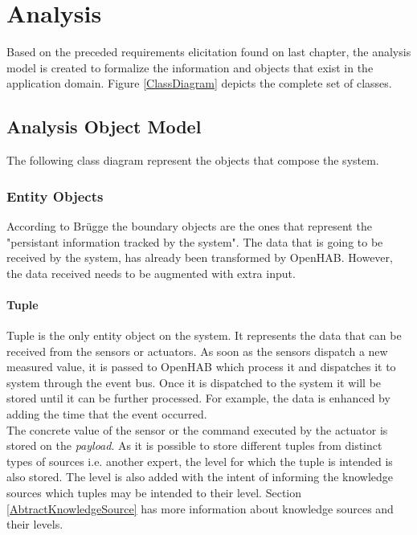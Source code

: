 
		
\chapter{Analysis}

Based on the preceded requirements elicitation found on last chapter, the analysis model is created to formalize the information and objects that exist in the application domain. Figure \ref{ClassDiagram} depicts the complete set of classes.


\section{Analysis Object Model}
	
The following class diagram represent the objects that compose the system.



\subsection{Entity Objects}

According to Br{\"u}gge \etAl\cite{Bruegge2004} the boundary objects are the ones that represent the "persistant information tracked by the system". The data that is going to be received by the system, has already been transformed by OpenHAB. However, the data received needs to be augmented with extra input.\\

\subsubsection{Tuple}
\label{Tuple}


Tuple is the only entity object on the system. It represents the data that can be received from the sensors or actuators. As soon as the sensors dispatch a new measured value, it is passed to OpenHAB which process it and dispatches it to system through the event bus. Once it is dispatched to the system it will be stored until it can be further processed. For example, the data is enhanced by adding the time that the event occurred.\\ 
The concrete value of the sensor or the command executed by the actuator is stored on the \textit{payload}. As it is possible to store different tuples from distinct types of sources i.e. another expert, the level for which the tuple is intended is also stored. The level is also added with the intent of informing the knowledge sources which tuples may be intended to their level. Section \ref{AbtractKnowledgeSource} has more information about knowledge sources and their levels. 


